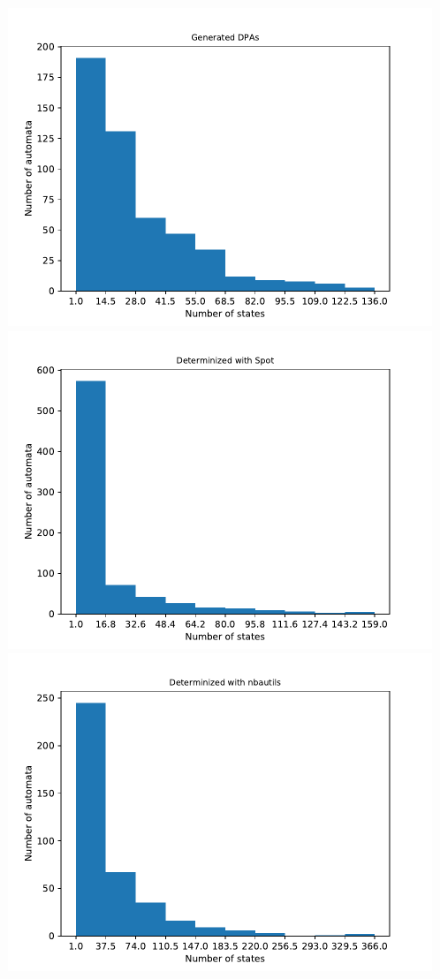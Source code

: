 \begin{figure}
	\centering
	\begin{minipage}{0.49\textwidth}
		\includegraphics[page=5,height=.3\textheight]{../data/analysis/rawstats_gendet.pdf} 
		\includegraphics[page=5,height=.3\textheight]{../data/analysis/rawstats_detspot.pdf} 
		\includegraphics[page=5,height=.3\textheight]{../data/analysis/rawstats_detnbaut.pdf}

\end{minipage}
\end{figure}
